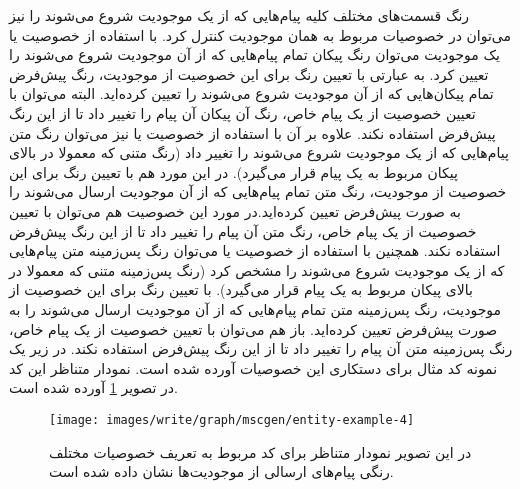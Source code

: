 رنگ قسمت‌های مختلف کلیه پیام‌هایی که از یک موجودیت شروع می‌شوند را نیز می‌توان
در خصوصیات مربوط به همان موجودیت کنترل کرد. با استفاده از خصوصیت
 یا  یک موجودیت می‌توان رنگ پیکان تمام
پیام‌هایی که از آن موجودیت شروع می‌شوند را تعیین کرد. به عبارتی با تعیین رنگ
برای این خصوصیت از موجودیت، رنگ پیش‌فرض تمام پیکان‌هایی که از آن موجودیت شروع
می‌شوند را تعیین کرده‌اید. البته می‌توان با تعیین خصوصیت  از یک
پیام خاص، رنگ آن پیکان آن پیام را تغییر داد تا از این رنگ پیش‌فرض استفاده نکند.
علاوه بر آن با استفاده از خصوصیت  یا  نیز
می‌توان رنگ متن پیام‌هایی که از یک موجودیت شروع می‌شوند را تغییر داد (رنگ متنی
که معمولا در بالای پیکان مربوط به یک پیام قرار می‌گیرد). در این مورد هم با تعیین
رنگ برای این خصوصیت از موجودیت، رنگ متن تمام پیام‌هایی که از آن موجودیت ارسال
می‌شوند را به صورت پیش‌فرض تعیین کرده‌اید.در مورد این خصوصیت هم می‌توان با تعیین
خصوصیت  از یک پیام خاص، رنگ متن آن پیام را تغییر داد تا از این رنگ
پیش‌فرض استفاده نکند. همچنین با استفاده از خصوصیت  یا  می‌توان رنگ
پس‌زمینه متن پیام‌هایی که از یک موجودیت شروع می‌شوند را مشخص کرد (رنگ پس‌زمینه
متنی که معمولا در بالای پیکان مربوط به یک پیام قرار می‌گیرد). با تعیین
رنگ برای این خصوصیت از موجودیت، رنگ پس‌زمینه متن تمام پیام‌هایی که از آن موجودیت ارسال می‌شوند را به
صورت پیش‌فرض تعیین کرده‌اید. باز هم می‌توان با تعیین خصوصیت  از
یک پیام خاص، رنگ پس‌زمینه متن آن پیام را تغییر داد تا از این رنگ پیش‌فرض استفاده
نکند. در زیر یک نمونه کد مثال برای دستکاری این خصوصیات آورده شده است. نمودار
متناظر این کد در تصویر \ref{images/write/graph/mscgen/entity-example-4} آورده
شده است.


\begin{figure}[h]
	\centering
	\texttt{[image: images/write/graph/mscgen/entity-example-4]}
	\caption[مثالی از نحوه تعریف خصوصیات مختلف موجودیت‌ها برای کنترل پیام‌های یک
	موجودیت]
	{در این تصویر نمودار متناظر برای کد مربوط به تعریف خصوصیات
	مختلف رنگی پیام‌های ارسالی از موجودیت‌ها نشان داده شده است.}
	\label{images/write/graph/mscgen/entity-example-4}
\end{figure}

